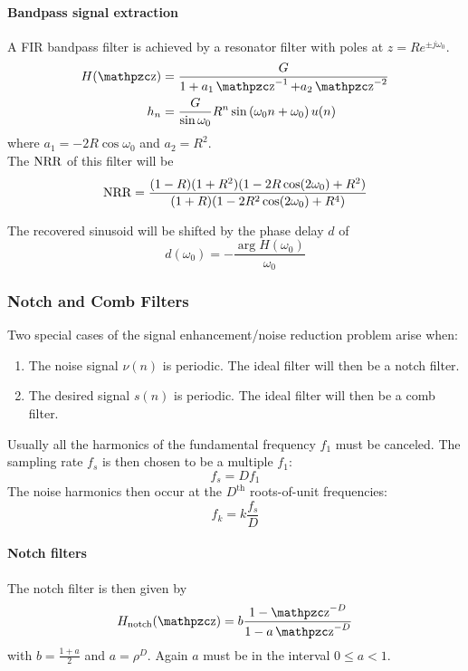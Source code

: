 \paragraph{Bandpass signal extraction}
A FIR bandpass filter is achieved by a resonator filter with poles at $z = R e^{\pm j \omega_0}$.
\begin{align*}
	H(\z) &= \frac{G}{1 + a_1 \z^{-1} + a_2 \z^{-2}} \\
	h_n &= \frac{G}{\sin \omega_0} R^n \sin\left(\omega_0 n + \omega_0\right) u(n)
\end{align*}
where $a_1 = -2R \cos\omega_0$ and $a_2 = R^2$. \\

The $\operatorname{\text{NRR}}$ of this filter will be
\begin{equation*}
	\operatorname{\text{NRR}}= \frac{(1-R)(1+R^2)(1-2R\cos(2\omega_0)+R^2)}{(1+R)(1-2R^2\cos(2\omega_0)+R^4)}
\end{equation*}

The recovered sinusoid will be shifted by the phase delay $d$ of
\begin{equation*}
	d(\omega_0) = - \frac{\arg H(\omega_0)}{\omega_0}
\end{equation*}


\subsubsection{Notch and Comb Filters}

Two special cases of the signal enhancement/noise reduction problem arise when:
\begin{enumerate}
	\item The noise signal $\nu(n)$ is periodic. The ideal filter will then
	be a notch filter.
	\item The desired signal $s(n)$ is periodic. The ideal filter will then
	be a comb filter.
\end{enumerate}

Usually all the harmonics of the fundamental frequency $f_1$ must be canceled.
The sampling rate $f_s$ is then chosen to be a multiple $f_1$:
\begin{equation*}
	f_s = D f_1
\end{equation*}
The noise harmonics then occur at the $D^{\text{th}}$ roots-of-unit frequencies:
\begin{equation*}
	f_k = k \frac{f_s}{D}
\end{equation*}

\paragraph{Notch filters}The notch filter is then given by
\begin{equation*}
	H_{\text{notch}}(\z) = b \frac{1-\z^{-D}}{1-a\z^{-D}}
\end{equation*}
with $b = \frac{1+a}{2}$ and $a = \rho^D$. Again $a$ must be in the interval
$0 \leq a < 1$. \\

